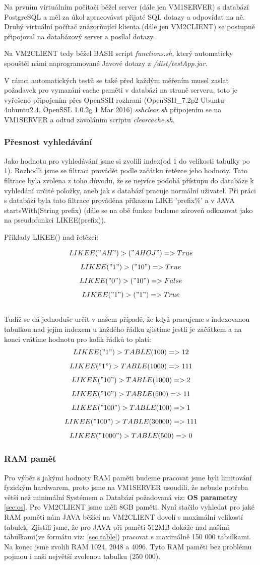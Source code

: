 \documentclass[a4paper, 11pt]{article}
\begin{document}
Na prvním virtuálním počítači běžel server (dále jen VM1SERVER) s databází PostgreSQL a měl za úkol zpracovávat přijaté SQL dotazy a odpovídat na ně.
Druhý virtuální počítač znázorňující klienta (dále jen VM2CLIENT) se postupně připojoval na databázový server a posílal dotazy. 

Na VM2CLIENT tedy běžel BASH \cite{bash_web} script \textit{functions.sh}, který automaticky spouštěl námi naprogramované Javové dotazy z \textit{/dist/testApp.jar}.

V rámci automatických testů se také před každým měřením musel zaslat požadavek pro vymazání cache paměti v databázi na straně serveru, toto je vyřešeno připojením přes OpenSSH rozhrani (OpenSSH\_7.2p2 Ubuntu-4ubuntu2.4, OpenSSL 1.0.2g  1 Mar 2016) \cite{openssh} \textit{sshclear.sh} připojením se na VM1SERVER a odtud zavoláním scriptu \textit{clearcache.sh}.

\subsubsection{Přesnost vyhledávání}
Jako hodnotu pro vyhledávání jsme si zvolili index(od 1 do velikosti tabulky po 1). Rozhodli jsme se filtraci provádět podle začátku řetězce jeho hodnoty. Tato filtrace byla zvolena z toho důvodu, že se nejvíce podobá přístupu do databáze k vyhledání určité položky, aneb jak s databází pracuje normální uživatel. Při práci s databázi byla tato filtrace prováděna příkazem LIKE 'prefix\%' \cite{sqllike} a v JAVA startsWith(String prefix) \cite{javalike}(dále se na obě funkce budeme zároveň odkazovat jako na pseudofunkci LIKEE(prefix)).

Příklady LIKEE() nad řetězci:

$$LIKEE("AH") > ("AHOJ") => True$$
$$LIKEE("1") > ("10") => True$$
$$LIKEE("0") > ("10") => False$$
$$LIKEE("1") > ("1") => True$$
\\
Tudíž se dá jednoduše určit v našem případě, že když pracujeme s indexovanou tabulkou nad jejím indexem u každého řádku zjistíme jestli je začátkem a na konci vrátíme hodnotu pro kolik řádků to platí:
$$LIKEE("1") > TABLE(100) => 12$$
$$LIKEE("1") > TABLE(1000) => 111$$
$$LIKEE("10") > TABLE(1000) => 2$$
$$LIKEE("10") > TABLE(500)=> 11$$
$$LIKEE("100") > TABLE(100)=> 1$$
$$LIKEE("100") > TABLE(30000) => 111$$
$$LIKEE("1000") > TABLE(500) => 0$$

\subsubsection{RAM pamět}
Pro výběr s jakými hodnoty RAM paměti budeme pracovat jsme byli limitování fyzickým hardwarem, proto jsme na VM1SERVER usoudili, že nebude potřeba větší než minimální Systémem a Databází požadovaná viz: \textbf{OS parametry} \ref{sec:os}. Pro VM2CLIENT jsme měli 8GB paměti. Nyní stačilo vyhledat pro jaké RAM paměti nám JAVA běžící na VM2CLIENT dovolí s maximální velikostí tabulek. Zjistili jsme, že pro JAVA při paměti 512MB dokáže nad našími tabulkami(ve formátu viz: \ref{sec:table}) pracovat s maximálně 150 000 tabulkami. Na konec jsme zvolili RAM 1024, 2048 a 4096. Tyto RAM paměti bez problému pojmou i naši největší zvolenou tabulku (250 000).
\end{document}
